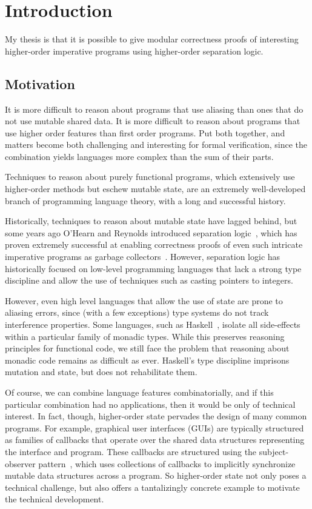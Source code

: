 \chapter{Introduction}

My thesis is that it is possible to give modular correctness proofs of
interesting higher-order imperative programs using higher-order
separation logic.

\section{Motivation}

It is more difficult to reason about programs that use aliasing than
ones that do not use mutable shared data. It is more difficult to
reason about programs that use higher order features than first order
programs. Put both together, and matters become both challenging and
interesting for formal verification, since the combination yields
languages more complex than the sum of their parts. 

Techniques to reason about purely functional programs, which
extensively use higher-order methods but eschew mutable state, are an
extremely well-developed branch of programming language theory, with a
long and successful history.

Historically, techniques to reason about mutable state have lagged
behind, but some years ago O'Hearn and Reynolds introduced separation
logic~\citep{sep-logic}, which has proven extremely successful at
enabling correctness proofs of even such intricate imperative programs
as garbage collectors~\citep{gc-proof}. However, separation logic has
historically focused on low-level programming languages that lack a
strong type discipline and allow the use of techniques such as casting
pointers to integers.

However, even high level languages that allow the use of state are
prone to aliasing errors, since (with a few exceptions) type systems
do not track interference properties. Some languages, such as
Haskell~\cite{haskell-report}, isolate all side-effects within a
particular family of monadic types. While this preserves reasoning
principles for functional code, we still face the problem that
reasoning about monadic code remains as difficult as ever. Haskell's
type discipline imprisons mutation and state, but does not
rehabilitate them.

Of course, we can combine language features combinatorially, and if
this particular combination had no applications, then it would be only
of technical interest. In fact, though, higher-order state pervades
the design of many common programs. For example, graphical user
interfaces (GUIs) are typically structured as families of callbacks
that operate over the shared data structures representing the
interface and program. These callbacks are structured using the
subject-observer pattern~\cite{gof}, which uses collections of
callbacks to implicitly synchronize mutable data structures across a
program. So higher-order state not only poses a technical challenge,
but also offers a tantalizingly concrete example to motivate the
technical development.

